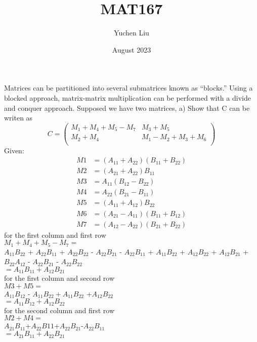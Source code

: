 \documentclass{article}
\title{MAT167}
\author{Yuchen Liu}
\date{August 2023}
\begin{document}
\maketitle

Matrices can be partitioned into several submatrices known as “blocks.” Using a blocked approach,
matrix-matrix multiplication can be performed with a divide and conquer approach. Supposed we have
two matrices,
a) Show that C can be writen as
\begin{equation*}
C=
    \begin{pmatrix}
    M_{1}+M_{4}+M_{5}-M_{7}& M_{3}+M_{5}\\
    M_{2}+M_{4}&M_{1}-M_{2}+M_{3}+M_{6}\\
    \end{pmatrix}
\end{equation*}
Given:
\begin{equation*}
\begin{aligned}
M1 &= (A_{11} + A_{22})(B_{11} + B_{22}) \\
M2 &= (A_{21} + A_{22})B_{11} \\
M3 &= A_{11}(B_{12} - B_{22}) \\
M4 &= A_{22}(B_{21} - B_{11}) \\
M5 &= (A_{11} + A_{12})B_{22} \\
M6 &= (A_{21} - A_{11})(B_{11} + B_{12}) \\
M7 &= (A_{12} - A_{22})(B_{21} + B_{22})
\end{aligned}
\end{equation*}
for the first column and first row\\
$M_{1}+M_{4}+M_{5}-M_{7}=$\\
$A_{11}B_{22}$ + \sout{$A_{22}B_{11}$} + \sout{$A_{22}B_{22}$} - \sout{$A_{22}B_{21}$} - \sout{$A_{22}B_{11}$} + \sout{$A_{11}B_{22}$} + \sout{$A_{12}B_{22}$} + $A_{12}B_{21}$ +\sout{ $B_{22}A_{12}$} - \sout{$A_{22}B_{21}$} - \sout{$A_{22}B_{22}$}
\\$=A_{11}B_{11}+A_{12}B_{21}$\\
for the first column and second row\\
$M3+M5=$\\
$A_{11}B_{12}$ - \sout{$A_{11}B_{22} + A_{11}B_{22}$} +$ A_{12}B_{22}$\\
$=A_{11}B_{12} + A_{12}B_{22}$\\
for the second column and first row\\
$M2+M4=$\\
$A_{21}B_{11}$+\sout{$A_{22}B{11}$}+$A_{22}B_{21}$-\sout{$A_{22}B_{11}$}\\$=A_{21}B_{11}+A_{22}B_{21}$\\
\end{document}

